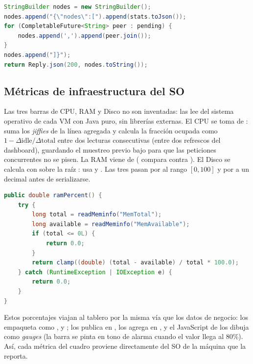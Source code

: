 \begin{lstlisting}[language=Java,caption={PanelEndpoint agrega el nodo local y los peers}]
StringBuilder nodes = new StringBuilder();
nodes.append("{\"nodes\":[").append(stats.toJson());
for (CompletableFuture<String> peer : pending) {
    nodes.append(',').append(peer.join());
}
nodes.append("]}");
return Reply.json(200, nodes.toString());
\end{lstlisting}

\subsection{Métricas de infraestructura del SO}

Las tres barras de CPU, RAM y Disco no son inventadas:  las lee
del sistema operativo de cada VM con Java puro, sin librerías externas. El CPU se
toma de :  suma los \emph{jiffies} de la
línea agregada  y calcula la fracción ocupada como
$1 - \Delta\text{idle}/\Delta\text{total}$ entre dos lecturas consecutivas (entre
dos refrescos del dashboard), guardando el muestreo previo bajo
 para que las peticiones concurrentes no se pisen. La RAM viene
de  ( compara  contra
). El Disco se calcula con  sobre la
raíz \codigo{/}:  usa  y
. Las tres pasan por  al rango
$[0, 100]$ y por  a un decimal antes de serializarse.

\begin{lstlisting}[language=Java,caption={Lectura de \%RAM y \%Disco del SO (NodeStats)}]
public double ramPercent() {
    try {
        long total = readMeminfo("MemTotal");
        long available = readMeminfo("MemAvailable");
        if (total <= 0L) {
            return 0.0;
        }
        return clamp((double) (total - available) / total * 100.0);
    } catch (RuntimeException | IOException e) {
        return 0.0;
    }
}
\end{lstlisting}

Estos porcentajes viajan al tablero por la misma vía que los datos de negocio:
 los empaqueta como ,  y
;  los publica en ,
 los agrega en , y el JavaScript de
 los dibuja como \emph{gauges} (la barra se pinta en tono
de alarma cuando el valor llega al 80\%). Así, cada métrica del cuadro proviene
directamente del SO de la máquina que la reporta.
